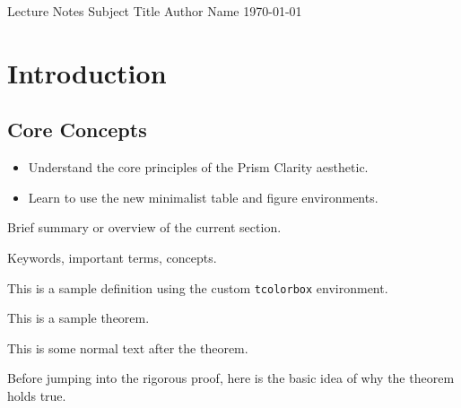 \documentclass[12pt, letterpaper, twoside]{book}
\begin{document}

\maketitlepage
{Lecture Notes}
{Subject Title}
{Author Name}
{\today}

\chapter{Introduction}
\section{Core Concepts}

\begin{objective}
  \begin{itemize}
    \item Understand the core principles of the Prism Clarity aesthetic.
    \item Learn to use the new minimalist table and figure environments.
  \end{itemize}
\end{objective}

\begin{overviewbox}
  Brief summary or overview of the current section.
\end{overviewbox}

\begin{termsbox}
  Keywords, important terms, concepts.
\end{termsbox}

\begin{definition}
  This is a sample definition using the custom \texttt{tcolorbox} environment.
\end{definition}

\begin{theorem}
  This is a sample theorem.
\end{theorem}
\begin{intertextbox}
This is some normal text after the theorem.\sidenotemark
\end{intertextbox}
\begin{intuition}
  Before jumping into the rigorous proof, here is the basic idea of why the theorem holds true.
\end{intuition}
\end{document}

